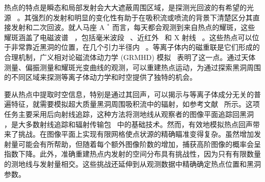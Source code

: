 \documentclass[aps,reprint,superscriptaddress,nofootinbib,floatfix,longbibliography,preprintnumbers]{revtex4-1}
\begin{document}
热点的特点是瞬态和局部发射会大大遮蔽周围区域，是探测光回波的有希望的光源~   \cite{Broderick:2005my,Broderick:2005jj,Moriyama:2015zfa,Saida:2016kpk,Moriyama:2019mhz,Tiede:2020jgo,Wong:2020ziu,Chesler:2020gtw,2022arXiv220403715L}   。其强烈的发射和明显的变化性有助于在吸积流或喷流的背景下清楚区分其直接发射和二次回波。就人马座 A    $^*$    而言，每天都会观测到来自热点的耀斑，这些耀斑涵盖了电磁波谱~   \cite{Trippe:2006jy,Marrone:2007tc,Witzel:2020yrp}   ，包括毫米波段~   \cite{Doeleman:2008qh,Fish:2008ji,Doeleman:2008xq,Johnson:2014msa,EventHorizonTelescope:2022ago,Wielgus:2022heh}   、近红外~   \cite{Genzel:2003as,Eckart:2006fc,Meyer:2006fd,Zamaninasab:2009df,Do:2019vob,GRAVITY:2023avo}    和 X 射线~   \cite{Baganoff:2001kw,Porquet:2003ic,Kusunose:2010xs,2017MNRAS.472.4422K,Haggard:2019mro,Andres:2021cpw}   。这些热点可以位于非常靠近黑洞的位置，在几个引力半径内~   \cite{gravity2018,GRAVITY:2020lpa,GRAVITY:2020hwn,Wielgus:2022heh,GRAVITY:2023avo}   。等离子体内的磁重联是它们形成的合理机制，广义相对论磁流体动力学 (GRMHD) 模拟~   \cite{Younsi:2015xna,Dexter:2020cuv,Ripperda:2020bpz,Porth:2020txf,Dexter:2020cuv,Ripperda:2020bpz,Chatterjee:2020wef,Ripperda:2021zpn,Vos:2023ska,xi2024revisiting}    表明了这一点。通过天体测量、偏振测量和耀斑光变曲线的观测，可以重建热点运动，为通过探索黑洞周围的不同区域来探测等离子体动力学和时空提供了独特的机会。  

要从热点中提取时空信息，特别是通过其回声，可以揭示与等离子体成分无关的普遍特征，就需要模拟超大质量黑洞周围吸积流中的辐射，如参考文献~   \cite{Broderick:2005my,Meyer:2006fd,Trippe:2006jy,Hamaus:2008yw,Zamaninasab:2009df,Tiede:2020jgo,GRAVITY:2020hwn,Matsumoto:2020wul,Dokuchaev:2020rye,GRAVITY:2020lpa,2022arXiv220403715L,Wielgus:2022heh,Vos:2022yij,Rosa:2022toh,Guo:2022ghl,Aimar:2023kzj,Vincent:2023sbw,Rosa:2023qcv,Najafi-Ziyazi:2023oil,Yfantis:2023wsp,Levis:2023tpb,Chen:2023knf,vonFellenberg:2023hit,Rosa:2024bqv,Chen:2024ilc,Kocherlakota:2024hyq,Antonopoulou:2024qco,Yfantis:2024eab}    所示。这项任务主要采用后向射线追踪，这种方法将测地线从观察者的图像平面追踪回黑洞~   \cite{Bardeen:1973tla,Luminet:1979nyg}   ，是大多数射线追踪和辐射传输包~   \cite{Dexter:2016cdk,Moscibrodzka:2017lcu,Bronzwaer:2018lde,Pihajoki:2018ihj,Younsi:2019iee,Bronzwaer:2020kle,White:2022paq,Aimar:2023vcs,EventHorizonTelescope:2023hqy,Huang:2024bar}    中的基础技术。然而，有效地模拟热点回声带来了挑战。在图像平面上实现有限网格使点状源的精确瞄准变得复杂。虽然增加发射量可能会有所帮助，但随着每个额外图像阶数的增加，捕获高阶图像的概率会呈指数下降。此外，准确重建热点内发射的空间分布具有挑战性，因为只有有限数量的测地线与发射量相交。这些挑战还延伸到从观测数据中精确确定热点位置和黑洞参数。  
\end{document}
